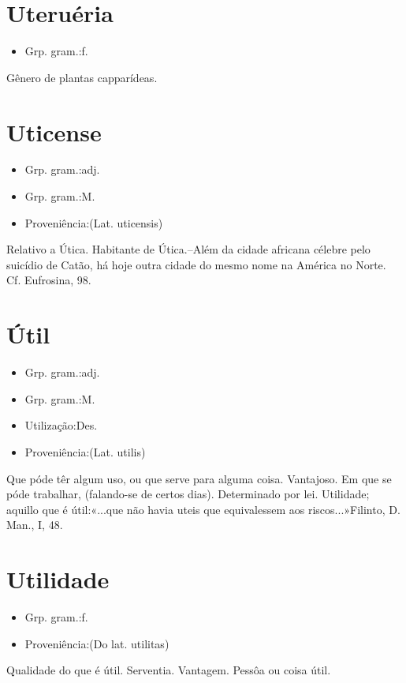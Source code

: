 \documentclass{article}
\begin{document}
\section{Uteruéria}
\begin{itemize}
\item {Grp. gram.:f.}
\end{itemize}
Gênero de plantas capparídeas.
\section{Uticense}
\begin{itemize}
\item {Grp. gram.:adj.}
\end{itemize}
\begin{itemize}
\item {Grp. gram.:M.}
\end{itemize}
\begin{itemize}
\item {Proveniência:(Lat. \textunderscore uticensis\textunderscore )}
\end{itemize}
Relativo a Útica.
Habitante de Útica.--Além da cidade africana célebre pelo suicídio de Catão, há hoje outra cidade do mesmo nome na América no Norte. Cf. \textunderscore Eufrosina\textunderscore , 98.
\section{Útil}
\begin{itemize}
\item {Grp. gram.:adj.}
\end{itemize}
\begin{itemize}
\item {Grp. gram.:M.}
\end{itemize}
\begin{itemize}
\item {Utilização:Des.}
\end{itemize}
\begin{itemize}
\item {Proveniência:(Lat. \textunderscore utilis\textunderscore )}
\end{itemize}
Que póde têr algum uso, ou que serve para alguma coisa.
Vantajoso.
Em que se póde trabalhar, (falando-se de certos dias).
Determinado por lei.
Utilidade; aquillo que é útil:«\textunderscore ...que não havia uteis que equivalessem aos riscos...\textunderscore »Filinto, \textunderscore D. Man.\textunderscore , I, 48.
\section{Utilidade}
\begin{itemize}
\item {Grp. gram.:f.}
\end{itemize}
\begin{itemize}
\item {Proveniência:(Do lat. \textunderscore utilitas\textunderscore )}
\end{itemize}
Qualidade do que é útil.
Serventia.
Vantagem.
Pessôa ou coisa útil.
\end{document}
